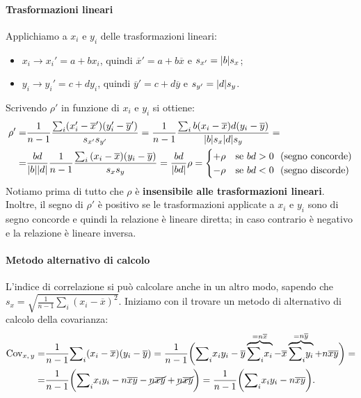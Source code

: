 \paragraph{Trasformazioni lineari}
Applichiamo a $x_i$ e $y_i$ delle trasformazioni lineari:
\begin{itemize}
    \item $x_i \longrightarrow x_i' = a + bx_i$, quindi $\overline{x}' = a + b\overline{x}$ e $\mathnormal{s}_{x'} = | b| \mathnormal{s}_x$;
    \item $y_i \longrightarrow y_i' = c + dy_i$, quindi $\overline{y}' = c + d\overline{y}$ e $\mathnormal{s}_{y'} = | d | \mathnormal{s}_y$.
\end{itemize}
Scrivendo $\rho'$ in funzione di $x_i$ e $y_i$ si ottiene:
\begin{align*}
\rho' =&
\frac {1}{n-1} \frac {{\sum}_i (x'_i - \overline{x}')(y'_i - \overline{y}')}{\mathnormal{s}_{x'} \mathnormal{s}_{y'}}
=
\frac{1}{n-1} \frac{\sum_i{b(x_i - \overline{x})d(y_i - \overline{y})}}{|b|\mathnormal{s}_{x} |d|\mathnormal{s}_{y}} = \\ =&
\frac{b d}{|b| |d|} \frac{1}{n-1} \frac{\sum_i{(x_i - \overline{x}})(y_i - \overline{y})}{\mathnormal{s}_{x} \mathnormal{s}_{y}} =
\frac{b d}{|bd|} \rho =
\begin{cases}
    +\rho & \text{se } bd > 0 \ \ (\text{segno concorde}) \\
    -\rho & \text{se } bd < 0 \ \ (\text{segno discorde})
\end{cases}
\end{align*}
Notiamo prima di tutto che $\rho$ è \textbf{insensibile alle trasformazioni lineari}. Inoltre, il segno di $\rho'$ è positivo se le trasformazioni applicate a $x_i$ e $y_i$ sono di segno concorde e quindi la relazione è lineare diretta; in caso contrario è negativo e la relazione è lineare inversa.

\paragraph{Metodo alternativo di calcolo}
L'indice di correlazione si può calcolare anche in un altro modo, sapendo che $s_x = \sqrt{\frac{1}{n-1} \sum_i{(x_i - \overline{x})^2}}$.
Iniziamo con il trovare un metodo di alternativo di calcolo della covarianza:
\begingroup\abovedisplayskip=0pt
\begin{align*}
\text{Cov}_{x, \, y} =&
\frac{1}{n-1} {\sum}_i{(x_i - \overline{x})(y_i - \overline{y})} =
\frac{1}{n-1} \biggl ({\sum}_i{x_i y_i} - \overline{y} \overbrace{{\sum}_i{x_i}}^{=n\overline x} - \overline{x} \overbrace{{\sum}_i{y_i}}^{=n\overline y} + n \overline{x} \overline{y} \biggr) = \\ =&
\frac{1}{n-1} \biggl ({\sum}_i{x_i y_i} - n \overline{x} \overline{y} - \cancel{n \overline{x} \overline{y}} + \cancel{n \overline{x} \overline{y}} \biggr ) =
\frac{1}{n-1} \biggl ({\sum}_i{x_i y_i} - n \overline{x} \overline{y} \biggr ).
\end{align*}
\endgroup

